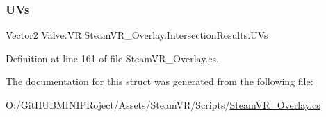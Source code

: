 \subsubsection{\texorpdfstring{UVs}{UVs}}
{\footnotesize\ttfamily Vector2 Valve.\+V\+R.\+Steam\+V\+R\+\_\+\+Overlay.\+Intersection\+Results.\+U\+Vs}



Definition at line 161 of file Steam\+V\+R\+\_\+\+Overlay.\+cs.



The documentation for this struct was generated from the following file\+:\begin{DoxyCompactItemize}
\item 
O\+:/\+Git\+H\+U\+B\+M\+I\+N\+I\+P\+Roject/\+Assets/\+Steam\+V\+R/\+Scripts/\mbox{\hyperlink{_steam_v_r___overlay_8cs}{Steam\+V\+R\+\_\+\+Overlay.\+cs}}\end{DoxyCompactItemize}
